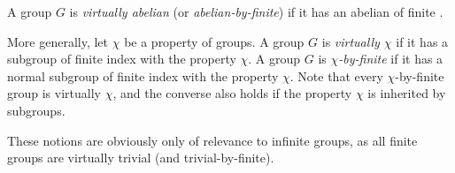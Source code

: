 \documentclass[12pt]{article}
\begin{document}

A group $G$ is \emph{virtually abelian} (or \emph{abelian-by-finite})
if it has an abelian  of finite .

More generally, let $\chi$ be a property of groups.
A group $G$ is \emph{virtually $\chi$} if it has a subgroup of finite index with the property $\chi$.
A group $G$ is \emph{$\chi$-by-finite} if it has a normal subgroup of finite index with the property $\chi$.
Note that every $\chi$-by-finite group is virtually $\chi$,
and the converse also holds if the property $\chi$ is inherited by subgroups.

These notions are obviously only of relevance to infinite groups, as all finite groups are virtually trivial (and trivial-by-finite).
\end{document}
